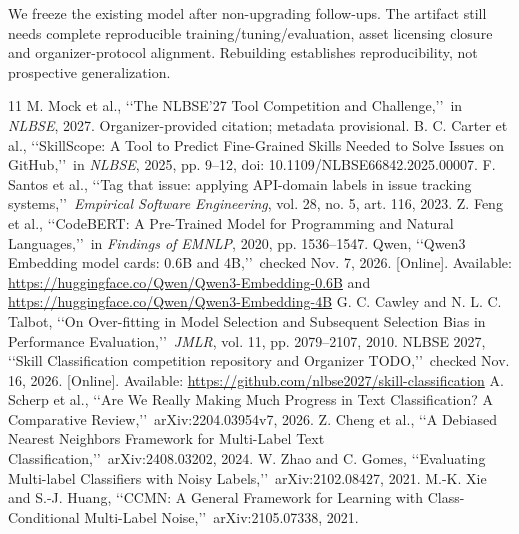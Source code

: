 \documentclass[10pt,conference]{IEEEtran}
\begin{document}
We freeze the existing model after non-upgrading follow-ups. The artifact still needs complete reproducible training/tuning/evaluation, asset licensing closure and organizer-protocol alignment. Rebuilding establishes reproducibility, not prospective generalization.

\begin{thebibliography}{11}
 M. Mock et al., \lq\lq The NLBSE'27 Tool Competition and Challenge,\rq\rq\ in \emph{NLBSE}, 2027. Organizer-provided citation; metadata provisional.
 B. C. Carter et al., \lq\lq SkillScope: A Tool to Predict Fine-Grained Skills Needed to Solve Issues on GitHub,\rq\rq\ in \emph{NLBSE}, 2025, pp. 9--12, doi: 10.1109/NLBSE66842.2025.00007.
 F. Santos et al., \lq\lq Tag that issue: applying API-domain labels in issue tracking systems,\rq\rq\ \emph{Empirical Software Engineering}, vol. 28, no. 5, art. 116, 2023.
 Z. Feng et al., \lq\lq CodeBERT: A Pre-Trained Model for Programming and Natural Languages,\rq\rq\ in \emph{Findings of EMNLP}, 2020, pp. 1536--1547.
 Qwen, \lq\lq Qwen3 Embedding model cards: 0.6B and 4B,\rq\rq\ checked Nov. 7, 2026. [Online]. Available: \url{https://huggingface.co/Qwen/Qwen3-Embedding-0.6B} and \url{https://huggingface.co/Qwen/Qwen3-Embedding-4B}
 G. C. Cawley and N. L. C. Talbot, \lq\lq On Over-fitting in Model Selection and Subsequent Selection Bias in Performance Evaluation,\rq\rq\ \emph{JMLR}, vol. 11, pp. 2079--2107, 2010.
 NLBSE 2027, \lq\lq Skill Classification competition repository and Organizer TODO,\rq\rq\ checked Nov. 16, 2026. [Online]. Available: \url{https://github.com/nlbse2027/skill-classification}
 A. Scherp et al., \lq\lq Are We Really Making Much Progress in Text Classification? A Comparative Review,\rq\rq\ arXiv:2204.03954v7, 2026.
 Z. Cheng et al., \lq\lq A Debiased Nearest Neighbors Framework for Multi-Label Text Classification,\rq\rq\ arXiv:2408.03202, 2024.
 W. Zhao and C. Gomes, \lq\lq Evaluating Multi-label Classifiers with Noisy Labels,\rq\rq\ arXiv:2102.08427, 2021.
 M.-K. Xie and S.-J. Huang, \lq\lq CCMN: A General Framework for Learning with Class-Conditional Multi-Label Noise,\rq\rq\ arXiv:2105.07338, 2021.
\end{thebibliography}
\end{document}
